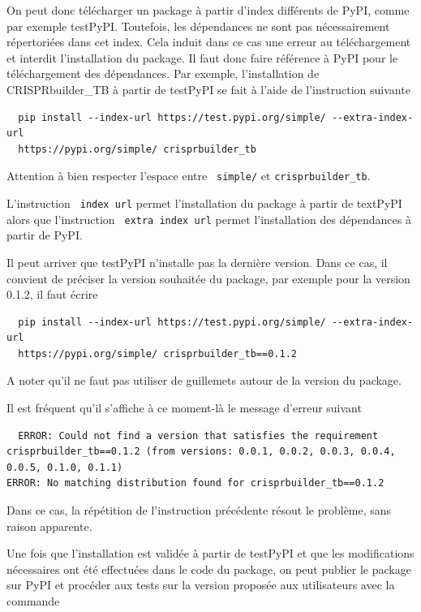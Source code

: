 \documentclass[twoside,a4paper,11pt,frenchb,openany]{report}
\begin{document}
On peut donc télécharger un package à partir d'index différents de PyPI, comme par exemple testPyPI. Toutefois, les dépendances ne sont pas nécessairement répertoriées dans cet index. Cela induit dans ce cas une erreur au téléchargement et interdit l'installation du package. Il faut donc faire référence à PyPI pour le téléchargement des dépendances. Par exemple, l'installation de CRISPRbuilder\_TB à partir de testPyPI se fait à l'aide de l'instruction suivante

\begin{verbatim}  pip install --index-url https://test.pypi.org/simple/ --extra-index-url 
  https://pypi.org/simple/ crisprbuilder_tb\end{verbatim} 

Attention à bien respecter l'espace entre \texttt{ simple/} et \texttt{crisprbuilder\_tb}.

L'instruction \texttt{ \textemdash \textemdash index \textemdash url} permet l'installation du package à partir de textPyPI alors que l'instruction \texttt{ \textemdash \textemdash extra \textemdash index \textemdash url} permet l'installation des dépendances à partir de PyPI.

Il peut arriver que testPyPI n'installe pas la dernière version. Dans ce cas, il convient de préciser la version souhaitée du package, par exemple pour la version 0.1.2, il faut écrire

\begin{verbatim}  pip install --index-url https://test.pypi.org/simple/ --extra-index-url 
  https://pypi.org/simple/ crisprbuilder_tb==0.1.2\end{verbatim} 

A noter qu'il ne faut pas utiliser de guillemets autour de la version du package.

Il est fréquent qu'il s'affiche à ce moment-là le message d'erreur suivant

\begin{verbatim}  ERROR: Could not find a version that satisfies the requirement crisprbuilder_tb==0.1.2 (from versions: 0.0.1, 0.0.2, 0.0.3, 0.0.4, 0.0.5, 0.1.0, 0.1.1)
ERROR: No matching distribution found for crisprbuilder_tb==0.1.2\end{verbatim}

Dans ce cas, la répétition de l'instruction précédente résout le problème, sans raison apparente.

Une fois que l'installation est validée à partir de testPyPI et que les modifications nécessaires ont été effectuées dans le code du package, on peut publier le package sur PyPI et procéder aux tests sur la version proposée aux utilisateurs avec la commande
\end{document}
